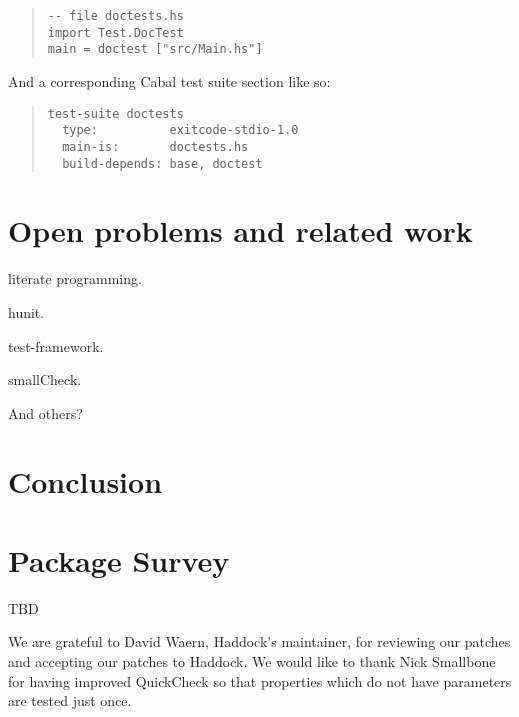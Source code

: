 \documentclass[preprint]{sigplanconf}
\begin{document}
\begin{quote}
\small
\begin{verbatim}
-- file doctests.hs
import Test.DocTest
main = doctest ["src/Main.hs"]
\end{verbatim}
\end{quote}

\noindent And a corresponding Cabal test suite section like so:

\begin{quote}
\small
\begin{verbatim}
test-suite doctests
  type:          exitcode-stdio-1.0
  main-is:       doctests.hs
  build-depends: base, doctest
\end{verbatim}
\end{quote}

\section{Open problems and related work}

literate programming.

hunit.

test-framework.

smallCheck.

And others?

\section{Conclusion}

\appendix

\section{Package Survey}

TBD

\acks

We are grateful to David Waern, Haddock's maintainer, for reviewing our patches
and accepting our patches to Haddock.
We would like to thank
Nick Smallbone for having improved QuickCheck so that 
properties which do not have parameters are tested just once.




\end{document}
